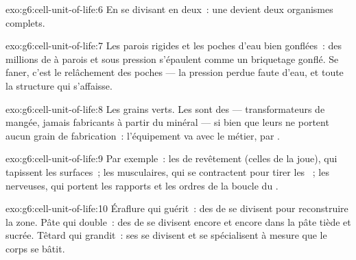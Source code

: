 \begin{solution}{exo:g6:cell-unit-of-life:6}
En se divisant en deux~: une  devient deux organismes
complets.
\end{solution}

\begin{solution}{exo:g6:cell-unit-of-life:7}
Les parois rigides et les poches d'eau bien gonflées~: des millions
de  à parois et sous pression s'épaulent comme un briquetage
gonflé. Se faner, c'est le relâchement des poches --- la pression
perdue faute d'eau, et toute la structure qui s'affaisse.
\end{solution}

\begin{solution}{exo:g6:cell-unit-of-life:8}
Les grains verts. Les  sont des  ---
transformateurs de  mangée, jamais fabricants à
partir du minéral --- si bien que leurs  ne portent aucun
grain de fabrication~: l'équipement va avec le métier,  par
.
\end{solution}

\begin{solution}{exo:g6:cell-unit-of-life:9}
Par exemple~: les  de revêtement (celles de la joue), qui
tapissent les surfaces~; les  musculaires, qui se
contractent pour tirer les ~; les  nerveuses, qui portent
les rapports et les ordres de la boucle du .
\end{solution}

\begin{solution}{exo:g6:cell-unit-of-life:10}
Éraflure qui guérit~: des  de  se divisent pour
reconstruire la zone. Pâte qui double~: des  de  se
divisent encore et encore dans la pâte tiède et sucrée. Têtard qui
grandit~: ses  se divisent et se spécialisent à mesure que
le corps se bâtit.
\end{solution}

